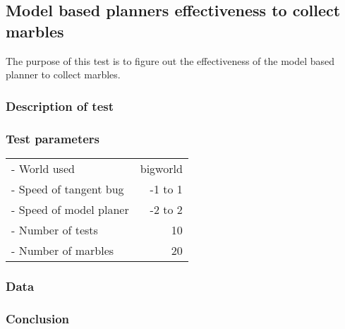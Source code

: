 \documentclass[../Head/Main.tex]{subfiles}
\begin{document}
\subsection{Model based planners effectiveness to collect marbles}

The purpose of this test is to figure out the effectiveness of the model based planner to collect marbles.

\subsubsection{Description of test}        


\subsubsection{Test parameters}

\begin{tabular}{l r}
	- World used                & bigworld\\	
	- Speed of tangent bug      & -1 to 1\\
	- Speed of model planer     & -2 to 2\\
	- Number of tests           & 10 \\
	- Number of marbles         & 20
\end{tabular}

\subsubsection{Data}





\subsubsection{Conclusion}
\end{document}
